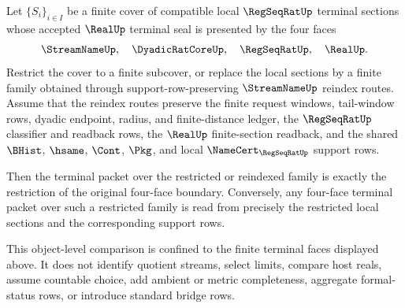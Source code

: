 \begin{theorem}
\label{thm:regseqrat-four-face-finite-section-restriction-functoriality}
Let $\{S_i\}_{i \in I}$ be a finite cover of compatible local
$\RegSeqRatUp$ terminal sections whose accepted $\RealUp$ terminal seal is
presented by the four faces
$$
\StreamNameUp,\quad \DyadicRatCoreUp,\quad \RegSeqRatUp,\quad \RealUp.
$$
Restrict the cover to a finite subcover, or replace the local sections by a
finite family obtained through support-row-preserving $\StreamNameUp$
reindex routes. Assume that the reindex routes preserve the finite request
windows, tail-window rows, dyadic endpoint, radius, and finite-distance
ledger, the $\RegSeqRatUp$ classifier and readback rows, the $\RealUp$
finite-section readback, and the shared $\BHist$, $\hsame$, $\Cont$, $\Pkg$,
and local $\NameCert_{\RegSeqRatUp}$ support rows.

Then the terminal packet over the restricted or reindexed family is exactly
the restriction of the original four-face boundary. Conversely, any
four-face terminal packet over such a restricted family is read from precisely
the restricted local sections and the corresponding support rows.

This object-level comparison is confined to the finite terminal faces
displayed above. It does not identify quotient streams, select limits,
compare host reals, assume countable choice, add ambient or metric
completeness, aggregate formal-status rows, or introduce standard bridge
rows.
\end{theorem}
